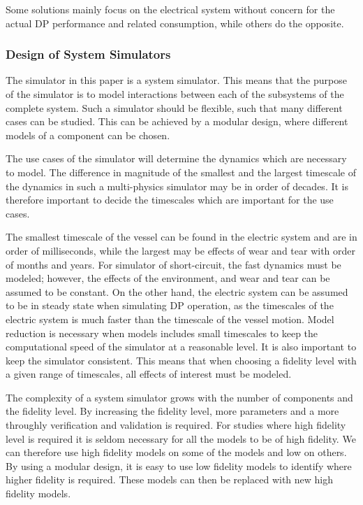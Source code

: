 \documentclass[journal]{IEEEtran}
\begin{document}
Some solutions mainly focus on the electrical system without concern for the actual DP performance and related consumption, while others do the opposite.


\subsubsection{Design of System Simulators}
The simulator in this paper is a system simulator.
This means that the purpose of the simulator is to model interactions between each of the subsystems of the complete system.
Such a simulator should be flexible, such that many different cases can be studied.
This can be achieved by a modular design, where different models of a component can be chosen.

The use cases of the simulator will determine the dynamics which are necessary to model.
The difference in magnitude of the smallest and the largest timescale of the dynamics in such a multi-physics simulator may be in order of decades.
It is therefore important to decide the timescales which are important for the use cases.

The smallest timescale of the vessel can be found in the electric system and are in order of milliseconds, while the largest may be effects of wear and tear with order of months and years.
For simulator of short-circuit, the fast dynamics must be modeled; however, the effects of the environment, and wear and tear can be assumed to be constant.
On the other hand, the electric system can be assumed to be in steady state when simulating DP operation, as the timescales of the electric system is much faster than the timescale of the vessel motion.
Model reduction is necessary when models includes small timescales to keep the computational speed of the simulator at a reasonable level.
It is also important to keep the simulator consistent.
This means that when choosing a fidelity level with a given range of timescales, all effects of interest must be modeled.

The complexity of a system simulator grows with the number of components and the fidelity level.
By increasing the fidelity level, more parameters and a more throughly verification and validation is required.
For studies where high fidelity level is required it is seldom necessary for all the models to be of high fidelity.
We can therefore use high fidelity models on some of the models and low on others.
By using a modular design, it is easy to use low fidelity models to identify where higher fidelity is required.
These models can then be replaced with new high fidelity models.
\end{document}

